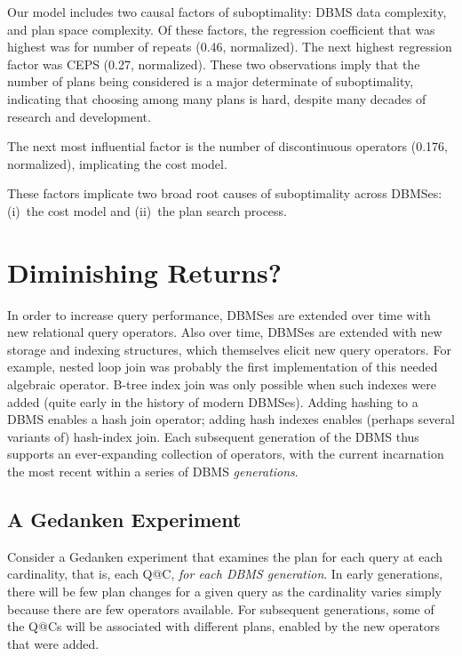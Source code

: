 \documentclass[prodmode,acmtods]{acmsmall}
\begin{document}
Our model includes two causal factors of suboptimality: \hbox{DBMS} data complexity, and plan space complexity. Of these factors,
the regression \hbox{coefficient} that was highest was for number of repeats (0.46, normalized). The next \hbox{highest}
regression factor was CEPS (0.27, normalized). These two observations imply that the
number of plans being considered is a major determinate of
suboptimality, indicating that choosing among many plans is hard, despite
many decades of research and development. 

The next most influential factor is the number of discontinuous operators
(0.176, normalized),
\hbox{implicating} the cost model.

These factors implicate two broad root causes of suboptimality across \hbox{DBMSes}:
(i)~the cost model and (ii)~the plan search process.

\section{Diminishing Returns?}\label{sec:diminishing}
In order to increase query performance, \hbox{DBMSes} are extended over time
with new \hbox{relational} query operators. Also over time, \hbox{DBMSes}
are extended with new storage and indexing structures, which themselves
elicit new query operators. For example, nested loop join was probably the
first implementation of this needed algebraic operator. B-tree index join
was only possible when such indexes were added (quite early in the history
of modern DBMSes). Adding hashing to a DBMS enables a hash join operator;
adding hash indexes enables (perhaps several variants of) hash-index join. Each
subsequent generation of the \hbox{DBMS} thus supports an ever-expanding
collection of operators, with the current incarnation the most recent
within a series of \hbox{DBMS} {\em generations}.

\subsection{A Gedanken Experiment}\label{sec:gedanken}
Consider a Gedanken experiment that examines the plan for each query at
each cardinality, that is, each Q@C, {\em for each \hbox{DBMS} generation}. In early
generations, there will be few plan changes for a given query as the cardinality varies
simply \hbox{because} there are few operators available. For
subsequent generations, some of the Q@Cs will be associated with different plans,
enabled by the new operators that were added.
\end{document}
